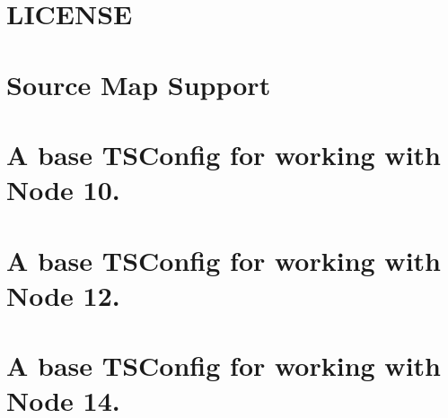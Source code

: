 \documentclass[twoside]{book}
\newcommand{\+}{\discretionary{\mbox{\scriptsize$\hookleftarrow$}}{}{}}
\begin{document}
\chapter{LICENSE}
\label{md__c___users_vaishnavi_jadhav__desktop__developer_code_mean_stack_example_server_node_modules__ee0f1b24145d94fc25d5355db376f371}

\chapter{Source Map Support}
\label{md__c___users_vaishnavi_jadhav__desktop__developer_code_mean_stack_example_server_node_modules__1908dcc947528e23b91f828e5e69b76e}

\chapter{A base TSConfig for working with Node 10.}
\label{md__c___users_vaishnavi_jadhav__desktop__developer_code_mean_stack_example_server_node_modules__tsconfig_node10__r_e_a_d_m_e}

\chapter{A base TSConfig for working with Node 12.}
\label{md__c___users_vaishnavi_jadhav__desktop__developer_code_mean_stack_example_server_node_modules__tsconfig_node12__r_e_a_d_m_e}

\chapter{A base TSConfig for working with Node 14.}
\label{md__c___users_vaishnavi_jadhav__desktop__developer_code_mean_stack_example_server_node_modules__tsconfig_node14__r_e_a_d_m_e}

\end{document}
